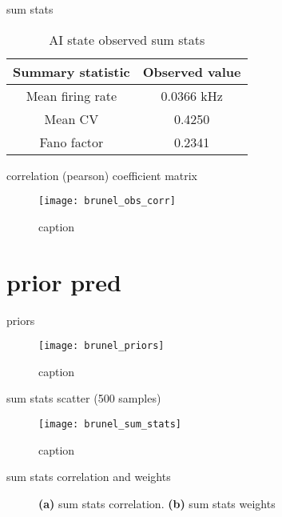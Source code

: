 sum stats

\begin{table}[H]
  \caption{AI state observed sum stats}
  \begin{center}
    \begin{tabular}{cc}
      \toprule
      \textbf{Summary statistic} & \textbf{Observed value} \\
      \midrule
      Mean firing rate &  0.0366 kHz \\
      Mean CV &  0.4250  \\
      Fano factor & 0.2341  \\
      \bottomrule
    \end{tabular}
  \end{center}
  \label{tab:hh_noisy_sumstats}
\end{table}

correlation (pearson) coefficient matrix

\begin{figure}[H]
    \centering
    \texttt{[image: brunel\_obs\_corr]}
    \caption{caption}
    \label{fig:fig1}
\end{figure}

\section{prior pred}

priors

\begin{figure}[H]
    \centering
    \texttt{[image: brunel\_priors]}
    \caption{caption}
    \label{fig:fig1}
\end{figure}

sum stats scatter (500 samples)

\begin{figure}[H]
    \centering
    \texttt{[image: brunel\_sum\_stats]}
    \caption{caption}
    \label{fig:fig1}
\end{figure}


sum stats correlation and weights

\begin{figure}[H]
\centering
{}
\qquad
{}
\caption{\textbf{(a)} sum stats correlation. \textbf{(b)} sum stats weights
}
\label{fig:fig1}
\end{figure}


